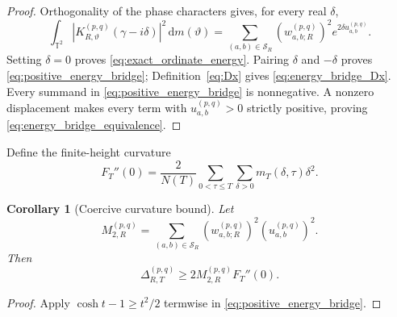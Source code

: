 \documentclass[11pt]{amsart}
\numberwithin{equation}{section}
\theoremstyle{plain}
\newtheorem{corollary}[theorem]{Corollary}
\theoremstyle{definition}
\theoremstyle{remark}
\newcommand{\Torus}{\mathbb T}
\newcommand{\dd}{\,\mathrm d}
\begin{document}
\begin{proof}
Orthogonality of the phase characters gives, for every real $\delta$,
\begin{equation}
\int_{\Torus^2}
\left|K_{R,\vartheta}^{(p,q)}(\gamma-i\delta)\right|^2
\dd m(\vartheta)
=
\sum_{(a,b)\in\mathcal S_R}
\left(w_{a,b;R}^{(p,q)}\right)^2
e^{2\delta u_{a,b}^{(p,q)}}.
\label{eq:phase_orthogonality_energy}
\end{equation}
Setting $\delta=0$ proves \eqref{eq:exact_ordinate_energy}.  Pairing $\delta$ and $-\delta$ proves \eqref{eq:positive_energy_bridge}; Definition~\eqref{eq:Dx} gives \eqref{eq:energy_bridge_Dx}.  Every summand in \eqref{eq:positive_energy_bridge} is nonnegative.  A nonzero displacement makes every term with $u_{a,b}^{(p,q)}>0$ strictly positive, proving \eqref{eq:energy_bridge_equivalence}.
\end{proof}

Define the finite-height curvature
\begin{equation}
F_T''(0)
=
\frac{2}{N(T)}
\sum_{0<\tau\leq T}
\sum_{\delta>0}m_T(\delta,\tau)\delta^2.
\label{eq:curvature}
\end{equation}

\begin{corollary}[Coercive curvature bound]
\label{cor:coercive_curvature}
Let
\begin{equation}
M_{2,R}^{(p,q)}
=
\sum_{(a,b)\in\mathcal S_R}
\left(w_{a,b;R}^{(p,q)}\right)^2
\left(u_{a,b}^{(p,q)}\right)^2.
\label{eq:M2R}
\end{equation}
Then
\begin{equation}
\boxed{
\Delta_{R,T}^{(p,q)}
\geq
2M_{2,R}^{(p,q)}F_T''(0).}
\label{eq:coercive_bridge}
\end{equation}
\end{corollary}

\begin{proof}
Apply $\cosh t-1\geq t^2/2$ termwise in \eqref{eq:positive_energy_bridge}.
\end{proof}
\end{document}
